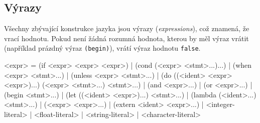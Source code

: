 \subsection{Výrazy}

Všechny zbývající konstrukce jazyka jsou výrazy (\emph{expressions}), což
znamená, že vrací hodnotu.  Pokud není žádná rozumná hodnota, kterou by měl
výraz vrátit (například prázdný výraz \texttt{(begin)}), vrátí výraz hodnotu
\texttt{false}.

\begin{gram}
<expr>        = (if <expr> <expr> <expr>)
              | (cond (<expr> <stmt>...)...)
              | (when <expr> <stmt>...)
              | (unless <expr> <stmt>...)
              | (do ((<ident> <expr> <expr>)...) (<expr> <stmt>...) <stmt>...)
              | (and <expr>...)
              | (or <expr>...)
              | (begin <stmt>...)
              | (let ((<ident> <expr>)...) <stmt>...)
              | (lambda (<ident>...) <stmt>...)
              | (<expr> <expr>...)
              | (extern <ident> <expr>...)
              | <integer-literal>
              | <float-literal>
              | <string-literal>
              | <character-literal>
\end{gram}

